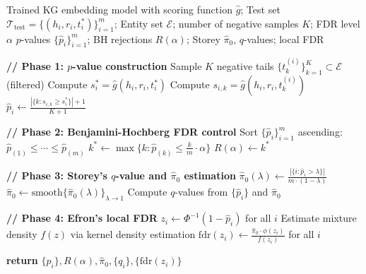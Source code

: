 \begin{algorithm}[t]
\caption{FDR-Based KG Completion Evaluation Protocol}
\label{alg:fdr-kg}
\begin{algorithmic}[1]
\Require Trained KG embedding model with scoring function $\hat{g}$;
         Test set $\mathcal{T}_{\text{test}} = \{(h_i, r_i, t^*_i)\}_{i=1}^m$;
         Entity set $\mathcal{E}$; number of negative samples $K$; FDR level $\alpha$
\Ensure $p$-values $\{\hat{p}_i\}_{i=1}^m$; BH rejections $R(\alpha)$; Storey $\hat{\pi}_0$, $q$-values; local FDR

\State \textbf{// Phase 1: $p$-value construction}
    \State Sample $K$ negative tails $\{t_k^{(i)}\}_{k=1}^K \subset \mathcal{E}$ (filtered)
    \State Compute $s_i^* = \hat{g}(h_i, r_i, t^*_i)$ 
        \State Compute $s_{i,k} = \hat{g}(h_i, r_i, t^{(i)}_k)$ 
    \EndFor
    \State $\hat{p}_i \gets \frac{|\{k: s_{i,k} \geq s_i^*\}| + 1}{K + 1}$ 
\EndFor

\State \textbf{// Phase 2: Benjamini-Hochberg FDR control}
\State Sort $\{\hat{p}_i\}_{i=1}^m$ ascending: $\hat{p}_{(1)} \leq \cdots \leq \hat{p}_{(m)}$
\State $k^* \gets \max\{k: \hat{p}_{(k)} \leq \frac{k}{m} \cdot \alpha\}$
\State $R(\alpha) \gets k^*$ 

\State \textbf{// Phase 3: Storey's $q$-value and $\hat{\pi}_0$ estimation}
\For{$\lambda \in \Lambda$} 
    \State $\hat{\pi}_0(\lambda) \gets \frac{|\{i: \hat{p}_i > \lambda\}|}{m \cdot (1-\lambda)}$ 
\EndFor
\State $\hat{\pi}_0 \gets \text{smooth}\{\hat{\pi}_0(\lambda)\}_{\lambda \to 1}$ 
\State Compute $q$-values from $\{\hat{p}_i\}$ and $\hat{\pi}_0$

\State \textbf{// Phase 4: Efron's local FDR}
\State $z_i \gets \Phi^{-1}(1 - \hat{p}_i)$ for all $i$ 
\State Estimate mixture density $f(z)$ via kernel density estimation
\State $\text{fdr}(z_i) \gets \frac{\hat{\pi}_0 \cdot \phi(z_i)}{f(z_i)}$ for all $i$ 

\State \textbf{return} $\{\hat{p}_i\}, R(\alpha), \hat{\pi}_0, \{q_i\}, \{\text{fdr}(z_i)\}$
\end{algorithmic}
\end{algorithm}

